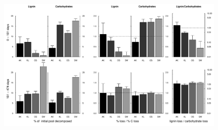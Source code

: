 \documentclass[10pt]{article}
\begin{document}
\begin{flushleft}
\newpage
\begin{figure}[h!]
\vspace*{2mm}
\begin{center}
\includegraphics{ligpaper-degrdiff}
\end{center}
\end{figure}


\end{flushleft}
\end{document}
